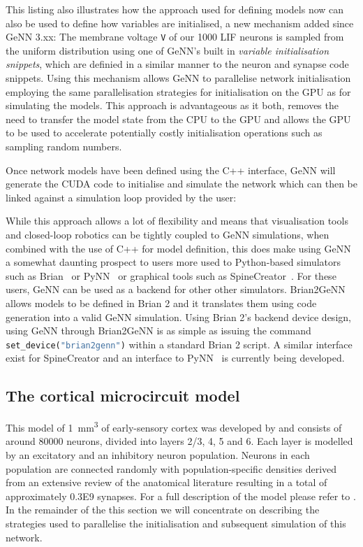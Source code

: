 \documentclass[utf8]{frontiersSCNS} %
\begin{document}
This listing also illustrates how the approach used for defining models now can also be used to define how variables are initialised, a new mechanism added since GeNN 3.xx:
The membrane voltage \lstinline{V} of our \num{1000} LIF neurons is sampled from the uniform distribution using one of GeNN's built in \textit{variable initialisation snippets}, which are definied in a similar manner to the neuron and synapse code snippets. Using this mechanism allows GeNN to parallelise network initialisation employing the same parallelisation strategies for initialisation on the GPU as for simulating the models.
This approach is advantageous as it both, removes the need to transfer the model state from the CPU to the GPU and allows the GPU to be used to accelerate potentially costly initialisation operations such as sampling random numbers.

Once network models have been defined using the C++ interface, GeNN will generate the CUDA code to initialise and simulate the network which can then be linked against a simulation loop provided by the user:



While this approach allows a lot of flexibility and means that visualisation tools and closed-loop robotics can be tightly coupled to GeNN simulations, when combined with the use of C++ for model definition, this does make using GeNN a somewhat daunting prospect to users more used to Python-based simulators such as Brian~\citep{Stimberg2014} or PyNN~\citep{Davison2008a} or graphical tools such as SpineCreator~\citep{Cope2017}.
For these users, GeNN can be used as a backend for other other simulators.
Brian2GeNN~\citep{Stimberg2018} allows models to be defined in Brian 2 and it translates them using code generation into a valid GeNN simulation. 
Using Brian 2's backend device design, using GeNN through Brian2GeNN is as simple as issuing the command \lstinline[language=python]{set_device("brian2genn")} within a standard Brian 2 script. 
A similar interface exist for SpineCreator and an interface to PyNN~\citep{Davison2008a} is currently being developed.

\subsection{The cortical microcircuit model}
\label{sec:method/microcircuit}
This model of \SI{1}{\milli\metre\cubed} of early-sensory cortex was developed by \citet{Potjans2012} and consists of around \num{80000} neurons, divided into layers 2/3, 4, 5 and 6.
Each layer is modelled by an excitatory and an inhibitory neuron population.
Neurons in each population are connected randomly with population-specific densities derived from an extensive review of the anatomical literature resulting in a total of approximately \num{0.3E9} synapses.
For a full description of the model please refer to \citeauthor{Potjans2012}.
In the remainder of the this section we will concentrate on describing the strategies used to parallelise the initialisation and subsequent simulation of this network.
\end{document}
